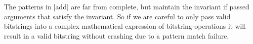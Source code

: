 The patterns in |add| are far from complete, but maintain the invariant if passed arguments that satisfy the invariant. So if we are careful to only pass valid bitstrings into a complex mathematical expression of bitstring-operations it will result in a valid bitstring without crashing due to a pattern match failure.

